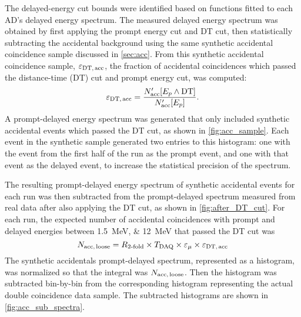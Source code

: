 The delayed-energy cut bounds were identified based on
functions fitted to each AD's delayed energy spectrum.
The measured delayed energy spectrum was obtained by first applying
the prompt energy cut and DT cut,
then statistically subtracting the accidental background
using the same synthetic accidental coincidence sample
discussed in \cref{sec:acc}.
From this synthetic accidental coincidence sample, $\varepsilon_{\text{DT,\,acc}}$,
the fraction of accidental  coincidences which passed the distance-time (DT) cut
and prompt energy cut, was computed:
\begin{equation}\label{eq:eps_DT_acc}
    \varepsilon_{\text{DT,\,acc}} =
    \frac{N_\text{acc}'[E_p \wedge \text{DT}]}{N_\text{acc}'[E_p]}.
\end{equation}
A prompt-delayed energy spectrum was generated that only included
synthetic accidental events which passed the DT cut,
as shown in \cref{fig:acc_sample}.
Each event in the synthetic sample generated two entries to this histogram:
one with the event from the first half of the run as the prompt event,
and one with that event as the delayed event,
to increase the statistical precision of the spectrum.

The resulting prompt-delayed energy spectrum of synthetic accidental events
for each run was then subtracted
from the prompt-delayed spectrum measured from real data
after also applying the DT cut, as shown in \cref{fig:after_DT_cut}.
For each run, the expected number of accidental coincidences
with prompt and delayed energies between \SIlist{1.5;12}{\MeV}
that passed the DT cut was
\begin{equation}
    N_{\text{acc,\,loose}} = R_{\text{\ensuremath{2}-fold}}
        \times T_\text{DAQ}\times \varepsilon_\mu
        \times \varepsilon_{\text{DT,\,acc}}
    \label{eq:nacc_loose}
\end{equation}
The synthetic accidentals prompt-delayed spectrum, represented as a histogram,
was normalized so that the integral was $N_{\text{acc,\,loose}}$.
Then the histogram was subtracted bin-by-bin from the corresponding histogram
representing the actual double coincidence data sample.
The subtracted histograms are shown in \cref{fig:acc_sub_spectra}.

